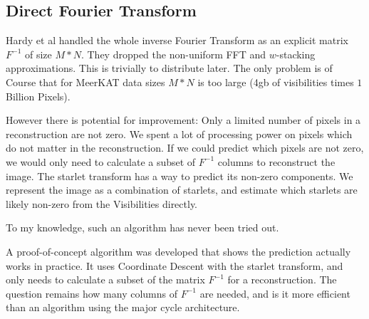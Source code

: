 \subsection{Direct Fourier Transform}
Hardy et al\cite{hardy2013direct} handled the whole inverse Fourier Transform as an explicit matrix $F^{-1}$ of size  $M*N$. They dropped the non-uniform FFT and $w$-stacking approximations. This is trivially to distribute later. The only problem is of Course that for MeerKAT data sizes $M*N$ is too large (4gb of visibilities times $1$ Billion Pixels).

However there is potential for improvement: Only a limited number of pixels in a reconstruction are not zero. We spent a lot of processing power on pixels which do not matter in the reconstruction. If we could predict which pixels are not zero, we would only need to calculate a subset of $F^{-1}$ columns to reconstruct the image. The starlet transform\cite{starck2015starlet} has a way to predict its non-zero components. We represent the image as a combination of starlets, and estimate which starlets are likely non-zero from the Visibilities directly.

To my knowledge, such an algorithm has never been tried out.

A proof-of-concept algorithm was developed that shows the prediction actually works in practice. It uses Coordinate Descent with the starlet transform, and only needs to calculate a subset of the matrix $F^{-1}$ for a reconstruction. The question remains how many columns of $F^{-1}$ are needed, and is it more efficient than an algorithm using the major cycle architecture.